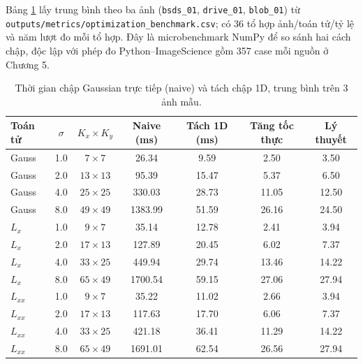 \documentclass[conference]{IEEEtran}
\begin{document}
Bảng \ref{tab:optimization-benchmark} lấy trung bình theo ba ảnh (\texttt{bsds\_01}, \texttt{drive\_01}, \texttt{blob\_01}) từ \texttt{outputs/metrics/optimization\_benchmark.csv}; có 36 tổ hợp ảnh/toán tử/tỷ lệ và năm lượt đo mỗi tổ hợp. Đây là microbenchmark NumPy để so sánh hai cách chập, độc lập với phép đo Python--ImageScience gồm 357 case mỗi nguồn ở Chương 5.

\begin{table}[t]
\centering
\caption{Thời gian chập Gaussian trực tiếp (naive) và tách chập 1D, trung bình trên 3 ảnh mẫu.}
\label{tab:optimization-benchmark}
\begin{tabular}{lcccccc}
\hline
Toán tử & $\sigma$ & $K_x \times K_y$ & Naive (ms) & Tách 1D (ms) & Tăng tốc thực & Lý thuyết \\
\hline
Gauss & 1.0 & $7 \times 7$ & 26.34 & 9.59 & 2.50 & 3.50 \\
Gauss & 2.0 & $13 \times 13$ & 95.39 & 15.47 & 5.37 & 6.50 \\
Gauss & 4.0 & $25 \times 25$ & 330.03 & 28.73 & 11.05 & 12.50 \\
Gauss & 8.0 & $49 \times 49$ & 1383.99 & 51.59 & 26.16 & 24.50 \\
$L_x$ & 1.0 & $9 \times 7$ & 35.14 & 12.78 & 2.41 & 3.94 \\
$L_x$ & 2.0 & $17 \times 13$ & 127.89 & 20.45 & 6.02 & 7.37 \\
$L_x$ & 4.0 & $33 \times 25$ & 449.94 & 29.74 & 13.46 & 14.22 \\
$L_x$ & 8.0 & $65 \times 49$ & 1700.54 & 59.15 & 27.06 & 27.94 \\
$L_{xx}$ & 1.0 & $9 \times 7$ & 35.22 & 11.02 & 2.66 & 3.94 \\
$L_{xx}$ & 2.0 & $17 \times 13$ & 117.63 & 17.70 & 6.06 & 7.37 \\
$L_{xx}$ & 4.0 & $33 \times 25$ & 421.18 & 36.41 & 11.29 & 14.22 \\
$L_{xx}$ & 8.0 & $65 \times 49$ & 1691.01 & 62.54 & 26.56 & 27.94 \\
\hline
\end{tabular}
\end{table}
\end{document}
